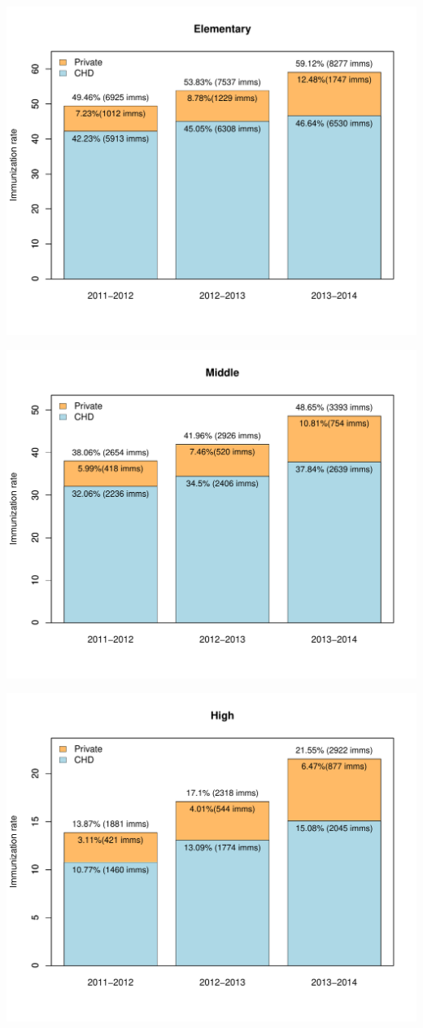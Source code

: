 \begin{center}
\includegraphics{county_wide_imm_rate_by_age_group-003}
\end{center}

\begin{center}
\includegraphics{county_wide_imm_rate_by_age_group-004}
\end{center}

\begin{center}
\includegraphics{county_wide_imm_rate_by_age_group-005}
\end{center}


